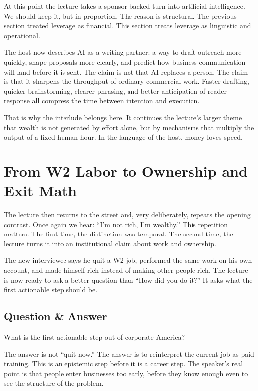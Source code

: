 At this point the lecture takes a sponsor-backed turn into artificial intelligence. We should keep it, but in proportion. The reason is structural. The previous section treated leverage as financial. This section treats leverage as linguistic and operational.

The host now describes AI as a writing partner: a way to draft outreach more quickly, shape proposals more clearly, and predict how business communication will land before it is sent. The claim is not that AI replaces a person. The claim is that it sharpens the throughput of ordinary commercial work. Faster drafting, quicker brainstorming, clearer phrasing, and better anticipation of reader response all compress the time between intention and execution.

That is why the interlude belongs here. It continues the lecture's larger theme that wealth is not generated by effort alone, but by mechanisms that multiply the output of a fixed human hour. In the language of the host, money loves speed.

\section{From W2 Labor to Ownership and Exit Math}

The lecture then returns to the street and, very deliberately, repeats the opening contrast. Once again we hear: ``I'm not rich, I'm wealthy.'' This repetition matters. The first time, the distinction was temporal. The second time, the lecture turns it into an institutional claim about work and ownership.

The new interviewee says he quit a W2 job, performed the same work on his own account, and made himself rich instead of making other people rich. The lecture is now ready to ask a better question than ``How did you do it?'' It asks what the first actionable step should be.

\subsection{Question \& Answer}

What is the first actionable step out of corporate America?

The answer is not ``quit now.'' The answer is to reinterpret the current job as paid training. This is an epistemic step before it is a career step. The speaker's real point is that people enter businesses too early, before they know enough even to see the structure of the problem.

